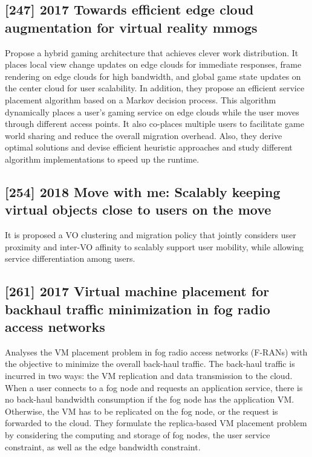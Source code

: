 \subsection{[247] 2017 Towards efficient edge cloud augmentation for virtual reality mmogs}
\label{subsec:paper16} \cite{zhang2017towards}
Propose a hybrid gaming architecture that achieves clever work distribution. It places local view change updates on edge clouds for immediate responses, frame rendering on edge clouds for high bandwidth, and global game state updates on the center cloud for user scalability. In addition, they propose an efficient service placement algorithm based on a Markov decision process. This algorithm dynamically places a user’s gaming service on edge clouds while the user moves through different access points. It also co-places multiple users to facilitate game world sharing and reduce the overall migration overhead. Also, they derive optimal solutions and devise efficient heuristic approaches and study different algorithm implementations to speed up the runtime.

\subsection{[254] 2018 Move with me: Scalably keeping virtual objects close to users on the move}
\label{subsec:paper17} \cite{bruschi2018move}
It is proposed a VO clustering and migration policy that jointly considers user proximity and inter-VO affinity to scalably support user mobility, while allowing service differentiation among users.

\subsection{[261] 2017 Virtual machine placement for backhaul traffic minimization in fog radio access networks}
\label{subsec:paper18} \cite{yu2017virtual}
Analyses the VM placement problem in fog radio access networks (F-RANs) with the objective to minimize the overall back-haul traffic. The back-haul traffic is incurred in two ways: the VM replication and data transmission to the cloud. When a user connects to a fog node and requests an application service, there is no back-haul bandwidth consumption if the fog node has the application VM. Otherwise, the VM has to be replicated on the fog node, or the request is forwarded to the cloud. They formulate the replica-based VM placement problem by considering the computing and storage of fog nodes, the user service constraint, as well as the edge bandwidth constraint.


